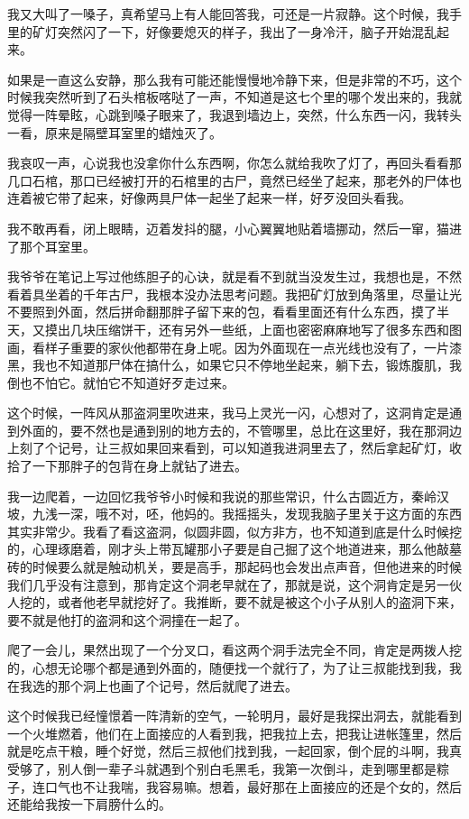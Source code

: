 我又大叫了一嗓子，真希望马上有人能回答我，可还是一片寂静。这个时候，我手里的矿灯突然闪了一下，好像要熄灭的样子，我出了一身冷汗，脑子开始混乱起来。

如果是一直这么安静，那么我有可能还能慢慢地冷静下来，但是非常的不巧，这个时候我突然听到了石头棺板喀哒了一声，不知道是这七个里的哪个发出来的，我就觉得一阵晕眩，心跳到嗓子眼来了，我退到墙边上，突然，什么东西一闪，我转头一看，原来是隔壁耳室里的蜡烛灭了。

我哀叹一声，心说我也没拿你什么东西啊，你怎么就给我吹了灯了，再回头看看那几口石棺，那口已经被打开的石棺里的古尸，竟然已经坐了起来，那老外的尸体也连着被它带了起来，好像两具尸体一起坐了起来一样，好歹没回头看我。

我不敢再看，闭上眼睛，迈着发抖的腿，小心翼翼地贴着墙挪动，然后一窜，猫进了那个耳室里。

我爷爷在笔记上写过他练胆子的心诀，就是看不到就当没发生过，我想也是，不然看着具坐着的千年古尸，我根本没办法思考问题。我把矿灯放到角落里，尽量让光不要照到外面，然后拼命翻那胖子留下来的包，看看里面还有什么东西，摸了半天，又摸出几块压缩饼干，还有另外一些纸，上面也密密麻麻地写了很多东西和图画，看样子重要的家伙他都带在身上呢。因为外面现在一点光线也没有了，一片漆黑，我也不知道那尸体在搞什么，如果它只不停地坐起来，躺下去，锻炼腹肌，我倒也不怕它。就怕它不知道好歹走过来。

这个时候，一阵风从那盗洞里吹进来，我马上灵光一闪，心想对了，这洞肯定是通到外面的，要不然也是通到别的地方去的，不管哪里，总比在这里好，我在那洞边上刻了个记号，让三叔如果回来看到，可以知道我进洞里去了，然后拿起矿灯，收拾了一下那胖子的包背在身上就钻了进去。

我一边爬着，一边回忆我爷爷小时候和我说的那些常识，什么古圆近方，秦岭汉坡，九浅一深，哦不对，呸，他妈的。我摇摇头，发现我脑子里关于这方面的东西其实非常少。我看了看这盗洞，似圆非圆，似方非方，也不知道到底是什么时候挖的，心理琢磨着，刚才头上带瓦罐那小子要是自己掘了这个地道进来，那么他敲墓砖的时候要么就是触动机关，要是高手，那起码也会发出点声音，但他进来的时候我们几乎没有注意到，那肯定这个洞老早就在了，那就是说，这个洞肯定是另一伙人挖的，或者他老早就挖好了。我推断，要不就是被这个小子从别人的盗洞下来，要不就是他打的盗洞和这个洞撞在一起了。

爬了一会儿，果然出现了一个分叉口，看这两个洞手法完全不同，肯定是两拨人挖的，心想无论哪个都是通到外面的，随便找一个就行了，为了让三叔能找到我，我在我选的那个洞上也画了个记号，然后就爬了进去。

这个时候我已经憧憬着一阵清新的空气，一轮明月，最好是我探出洞去，就能看到一个火堆燃着，他们在上面接应的人看到我，把我拉上去，把我让进帐篷里，然后就是吃点干粮，睡个好觉，然后三叔他们找到我，一起回家，倒个屁的斗啊，我真受够了，别人倒一辈子斗就遇到个别白毛黑毛，我第一次倒斗，走到哪里都是粽子，连口气也不让我喘，我容易嘛。想着，最好那在上面接应的还是个女的，然后还能给我按一下肩膀什么的。

